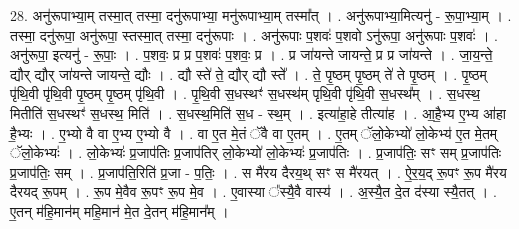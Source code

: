 \documentclass[17pt]{extarticle}
\begin{document}
28. अनु॑रूपाभ्या॒म् तस्मा॒त् तस्मा॒ दनु॑रूपाभ्या॒ मनु॑रूपाभ्या॒म् तस्मा᳚त् । . अनु॑रूपाभ्या॒मित्यनु॑ - रू॒पा॒भ्या॒म् । . तस्मा॒ दनु॑रूपा॒ अनु॑रूपा॒ स्तस्मा॒त् तस्मा॒ दनु॑रूपाः । . अनु॑रूपाः प॒शवः॑ प॒शवो ऽनु॑रूपा॒ अनु॑रूपाः प॒शवः॑ । . अनु॑रूपा॒ इत्यनु॑ - रू॒पाः॒ । . प॒शवः॒ प्र प्र प॒शवः॑ प॒शवः॒ प्र । . प्र जा॑यन्ते जायन्ते॒ प्र प्र जा॑यन्ते । . जा॒य॒न्ते॒ द्यौर् द्यौर् जा॑यन्ते जायन्ते॒ द्यौः । . द्यौ स्ते॑ ते॒ द्यौर् द्यौ स्ते᳚ । . ते॒ पृ॒ष्ठम् पृ॒ष्ठम् ते॑ ते पृ॒ष्ठम् । . पृ॒ष्ठम् पृ॑थि॒वी पृ॑थि॒वी पृ॒ष्ठम् पृ॒ष्ठम् पृ॑थि॒वी । . पृ॒थि॒वी स॒धस्थꣳ॑ स॒धस्थ॑म् पृथि॒वी पृ॑थि॒वी स॒धस्थ᳚म् । . स॒धस्थ॒ मितीति॑ स॒धस्थꣳ॑ स॒धस्थ॒ मिति॑ । . स॒धस्थ॒मिति॑ स॒ध - स्थ॒म् । . इत्या॑हा॒हे तीत्या॑ह । . आ॒है॒भ्य ए॒भ्य आ॑हा है॒भ्यः । . ए॒भ्यो वै वा ए॒भ्य ए॒भ्यो वै । . वा ए॒त मे॒तं ॅवै वा ए॒तम् । . ए॒तम् ॅलो॒केभ्यो॑ लो॒केभ्य॑ ए॒त मे॒तम् ॅलो॒केभ्यः॑ । . लो॒केभ्यः॑ प्र॒जाप॑तिः प्र॒जाप॑तिर् लो॒केभ्यो॑ लो॒केभ्यः॑ प्र॒जाप॑तिः । . प्र॒जाप॑तिः॒ सꣳ सम् प्र॒जाप॑तिः प्र॒जाप॑तिः॒ सम् । . प्र॒जाप॑ति॒रिति॑ प्र॒जा - प॒तिः॒ । . स मै॑रय दैरय॒थ् सꣳ स मै॑रयत् । . ऐ॒र॒य॒द् रू॒पꣳ रू॒प मै॑रय दैरयद् रू॒पम् । . रू॒प मे॒वैव रू॒पꣳ रू॒प मे॒व । . ए॒वास्या ᳚स्यै॒वै वास्य॑ । . अ॒स्यै॒त दे॒त द॑स्या स्यै॒तत् । . ए॒तन् म॑हि॒मान॑म् महि॒मान॑ मे॒त दे॒तन् म॑हि॒मान᳚म् । \newline
\end{document}
